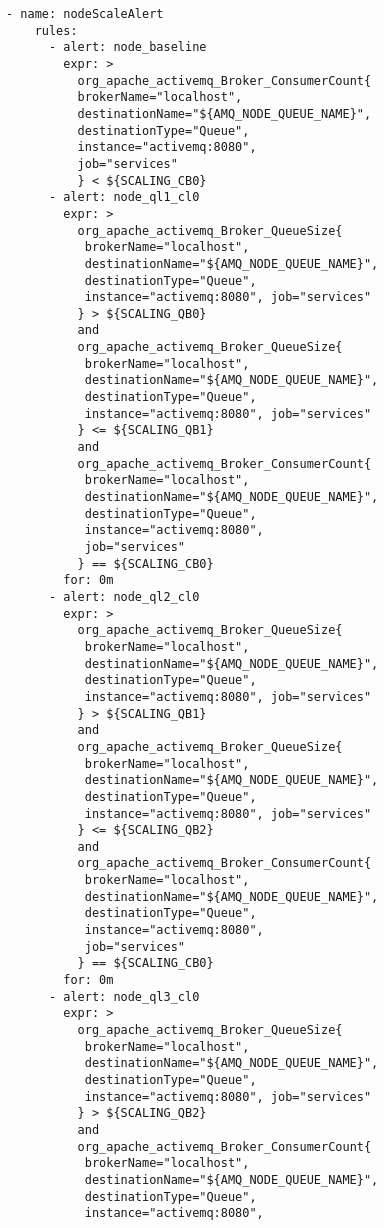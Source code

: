 \begin{lstlisting}[style=bashStyle,caption={alert-unparsed.yml},label=lst:alert-unparsed]
  - name: nodeScaleAlert
    rules:
      - alert: node_baseline
        expr: >
          org_apache_activemq_Broker_ConsumerCount{
          brokerName="localhost",
          destinationName="${AMQ_NODE_QUEUE_NAME}", 
          destinationType="Queue",
          instance="activemq:8080", 
          job="services"
          } < ${SCALING_CB0}
      - alert: node_ql1_cl0
        expr: >
          org_apache_activemq_Broker_QueueSize{
           brokerName="localhost", 
           destinationName="${AMQ_NODE_QUEUE_NAME}",
           destinationType="Queue", 
           instance="activemq:8080", job="services"
          } > ${SCALING_QB0}
          and 
          org_apache_activemq_Broker_QueueSize{
           brokerName="localhost", 
           destinationName="${AMQ_NODE_QUEUE_NAME}",
           destinationType="Queue", 
           instance="activemq:8080", job="services"
          } <= ${SCALING_QB1}
          and 
          org_apache_activemq_Broker_ConsumerCount{
           brokerName="localhost",
           destinationName="${AMQ_NODE_QUEUE_NAME}", 
           destinationType="Queue",
           instance="activemq:8080", 
           job="services"
          } == ${SCALING_CB0}
        for: 0m
      - alert: node_ql2_cl0
        expr: >
          org_apache_activemq_Broker_QueueSize{
           brokerName="localhost", 
           destinationName="${AMQ_NODE_QUEUE_NAME}",
           destinationType="Queue", 
           instance="activemq:8080", job="services"
          } > ${SCALING_QB1}
          and 
          org_apache_activemq_Broker_QueueSize{
           brokerName="localhost", 
           destinationName="${AMQ_NODE_QUEUE_NAME}",
           destinationType="Queue", 
           instance="activemq:8080", job="services"
          } <= ${SCALING_QB2}
          and 
          org_apache_activemq_Broker_ConsumerCount{
           brokerName="localhost",
           destinationName="${AMQ_NODE_QUEUE_NAME}", 
           destinationType="Queue",
           instance="activemq:8080", 
           job="services"
          } == ${SCALING_CB0}
        for: 0m
      - alert: node_ql3_cl0
        expr: >
          org_apache_activemq_Broker_QueueSize{
           brokerName="localhost", 
           destinationName="${AMQ_NODE_QUEUE_NAME}",
           destinationType="Queue", 
           instance="activemq:8080", job="services"
          } > ${SCALING_QB2}
          and 
          org_apache_activemq_Broker_ConsumerCount{
           brokerName="localhost",
           destinationName="${AMQ_NODE_QUEUE_NAME}", 
           destinationType="Queue",
           instance="activemq:8080", 

\end{lstlisting}
